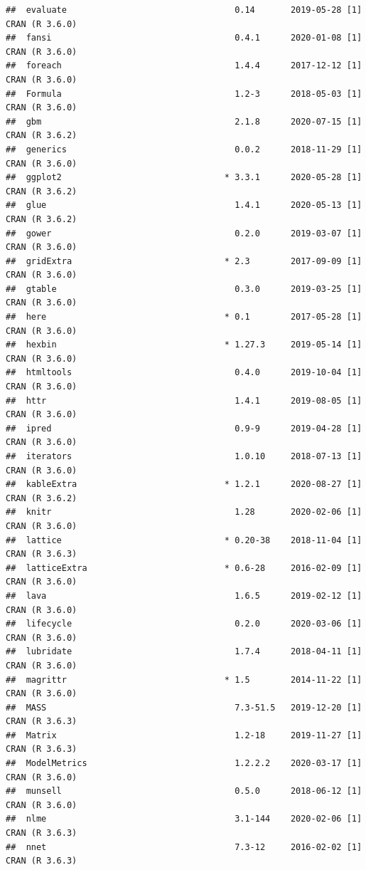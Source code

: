 \documentclass[]{article}
\begin{document}
\begin{verbatim}
##  evaluate                                 0.14       2019-05-28 [1] CRAN (R 3.6.0)
##  fansi                                    0.4.1      2020-01-08 [1] CRAN (R 3.6.0)
##  foreach                                  1.4.4      2017-12-12 [1] CRAN (R 3.6.0)
##  Formula                                  1.2-3      2018-05-03 [1] CRAN (R 3.6.0)
##  gbm                                      2.1.8      2020-07-15 [1] CRAN (R 3.6.2)
##  generics                                 0.0.2      2018-11-29 [1] CRAN (R 3.6.0)
##  ggplot2                                * 3.3.1      2020-05-28 [1] CRAN (R 3.6.2)
##  glue                                     1.4.1      2020-05-13 [1] CRAN (R 3.6.2)
##  gower                                    0.2.0      2019-03-07 [1] CRAN (R 3.6.0)
##  gridExtra                              * 2.3        2017-09-09 [1] CRAN (R 3.6.0)
##  gtable                                   0.3.0      2019-03-25 [1] CRAN (R 3.6.0)
##  here                                   * 0.1        2017-05-28 [1] CRAN (R 3.6.0)
##  hexbin                                 * 1.27.3     2019-05-14 [1] CRAN (R 3.6.0)
##  htmltools                                0.4.0      2019-10-04 [1] CRAN (R 3.6.0)
##  httr                                     1.4.1      2019-08-05 [1] CRAN (R 3.6.0)
##  ipred                                    0.9-9      2019-04-28 [1] CRAN (R 3.6.0)
##  iterators                                1.0.10     2018-07-13 [1] CRAN (R 3.6.0)
##  kableExtra                             * 1.2.1      2020-08-27 [1] CRAN (R 3.6.2)
##  knitr                                    1.28       2020-02-06 [1] CRAN (R 3.6.0)
##  lattice                                * 0.20-38    2018-11-04 [1] CRAN (R 3.6.3)
##  latticeExtra                           * 0.6-28     2016-02-09 [1] CRAN (R 3.6.0)
##  lava                                     1.6.5      2019-02-12 [1] CRAN (R 3.6.0)
##  lifecycle                                0.2.0      2020-03-06 [1] CRAN (R 3.6.0)
##  lubridate                                1.7.4      2018-04-11 [1] CRAN (R 3.6.0)
##  magrittr                               * 1.5        2014-11-22 [1] CRAN (R 3.6.0)
##  MASS                                     7.3-51.5   2019-12-20 [1] CRAN (R 3.6.3)
##  Matrix                                   1.2-18     2019-11-27 [1] CRAN (R 3.6.3)
##  ModelMetrics                             1.2.2.2    2020-03-17 [1] CRAN (R 3.6.0)
##  munsell                                  0.5.0      2018-06-12 [1] CRAN (R 3.6.0)
##  nlme                                     3.1-144    2020-02-06 [1] CRAN (R 3.6.3)
##  nnet                                     7.3-12     2016-02-02 [1] CRAN (R 3.6.3)

\end{verbatim}
\end{document}
